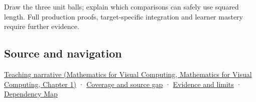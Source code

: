 Draw the three unit balls; explain which comparisons can safely use squared length. Full production proofs, target-specific integration and learner mastery require further evidence.

\subsection{Source and navigation}\label{appendix-49933872bb51-source-and-navigation}

\href{../02-Mathematics-for-Visual-Computing/main.pdf\#nameddest=01-foundations-i-ch017-a-ruler-needs-more-than-coordinate-components}{Teaching narrative (Mathematics for Visual Computing, Mathematics for Visual Computing, Chapter 1)} · \hyperref[appendix-fd090d982a15-phase-6---parts-501-600]{Coverage and source gap} · \hyperref[appendix-a103e7846d21-phase-6---source-analysis-and-verification]{Evidence and limits} · \hyperref[appendix-4ad47bdd269a]{Dependency Map}
